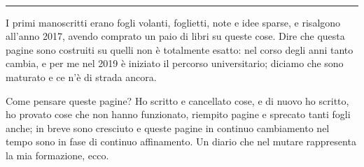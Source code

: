 

\thispagestyle{empty}

~\vfill
\hrule
{\small
\begin{multicols}{2}
I primi manoscritti erano fogli volanti, foglietti, note e idee sparse, e risalgono all'anno 2017, avendo comprato un paio di libri su queste cose. Dire che questa pagine sono costruiti su quelli non è totalmente esatto: nel corso degli anni tanto cambia, e per me nel 2019 è iniziato il percorso universitario; diciamo che sono maturato e ce n'è di strada ancora.

Come pensare queste pagine? Ho scritto e cancellato cose, e di nuovo ho scritto, ho provato cose che non hanno funzionato, riempito pagine e sprecato tanti fogli anche; in breve sono cresciuto e queste pagine in continuo cambiamento nel tempo sono in fase di continuo affinamento. Un diario che nel mutare rappresenta la mia formazione, ecco.
\end{multicols}
}

\cleardoublepage